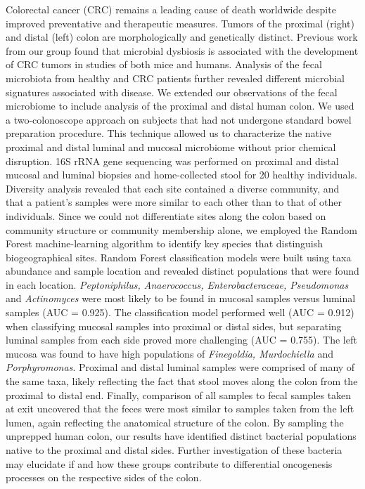 \documentclass[11pt,]{article}
\begin{document}
Colorectal cancer (CRC) remains a leading cause of death worldwide
despite improved preventative and therapeutic measures. Tumors of the
proximal (right) and distal (left) colon are morphologically and
genetically distinct. Previous work from our group found that microbial
dysbiosis is associated with the development of CRC tumors in studies of
both mice and humans. Analysis of the fecal microbiota from healthy and
CRC patients further revealed different microbial signatures associated
with disease. We extended our observations of the fecal microbiome to
include analysis of the proximal and distal human colon. We used a
two-colonoscope approach on subjects that had not undergone standard
bowel preparation procedure. This technique allowed us to characterize
the native proximal and distal luminal and mucosal microbiome without
prior chemical disruption. 16S rRNA gene sequencing was performed on
proximal and distal mucosal and luminal biopsies and home-collected
stool for 20 healthy individuals. Diversity analysis revealed that each
site contained a diverse community, and that a patient's samples were
more similar to each other than to that of other individuals. Since we
could not differentiate sites along the colon based on community
structure or community membership alone, we employed the Random Forest
machine-learning algorithm to identify key species that distinguish
biogeographical sites. Random Forest classification models were built
using taxa abundance and sample location and revealed distinct
populations that were found in each location. \emph{Peptoniphilus,
Anaerococcus, Enterobacteraceae, Pseudomonas} and \emph{Actinomyces}
were most likely to be found in mucosal samples versus luminal samples
(AUC = 0.925). The classification model performed well (AUC = 0.912)
when classifying mucosal samples into proximal or distal sides, but
separating luminal samples from each side proved more challenging (AUC =
0.755). The left mucosa was found to have high populations of
\emph{Finegoldia, Murdochiella} and \emph{Porphyromonas}. Proximal and
distal luminal samples were comprised of many of the same taxa, likely
reflecting the fact that stool moves along the colon from the proximal
to distal end. Finally, comparison of all samples to fecal samples taken
at exit uncovered that the feces were most similar to samples taken from
the left lumen, again reflecting the anatomical structure of the colon.
By sampling the unprepped human colon, our results have identified
distinct bacterial populations native to the proximal and distal sides.
Further investigation of these bacteria may elucidate if and how these
groups contribute to differential oncogenesis processes on the
respective sides of the colon.
\end{document}
